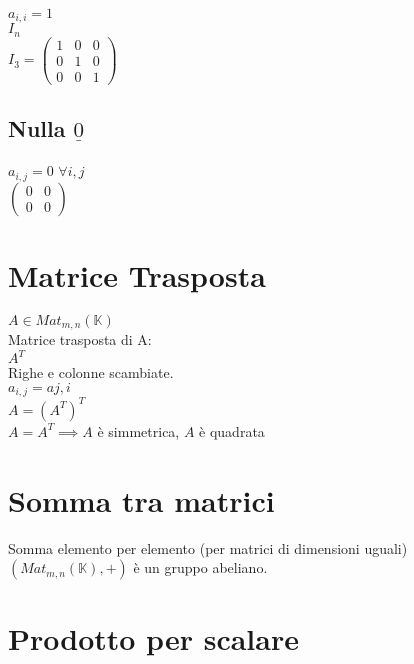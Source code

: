 \documentclass[a4paper, twoside, italian, 11pt]{book}
\newcommand{\K}{\mathbb K}
\begin{document}
$a_{i,i} = 1$ \\

\noindent
$I_n$ \\

\noindent
$I_3 = \begin{pmatrix}
1 & 0 & 0 \\
0 & 1 & 0 \\
0 & 0 & 1
\end{pmatrix}$


\subsection{Nulla $\underline{0}$}

$a_{i,j} = 0$ $\forall i, j$ \\

\noindent
$\begin{pmatrix}
0 & 0 \\
0 & 0
\end{pmatrix}$



\section{Matrice Trasposta}

$A \in Mat_{m,n}(\K)$ \\

\noindent
Matrice trasposta di A: \\
$A^T$ \\

\noindent
Righe e colonne scambiate. \\
$a_{i,j} = a{j,i}$ \\

\noindent
$A = (A^T)^T$ \\

\noindent
$A = A^T \implies A$ è simmetrica, $A$ è quadrata



\section{Somma tra matrici}

Somma elemento per elemento (per matrici di dimensioni uguali) \\

\noindent
$(Mat_{m,n}(\K), +)$ è un gruppo abeliano.



\section{Prodotto per scalare}
\end{document}
